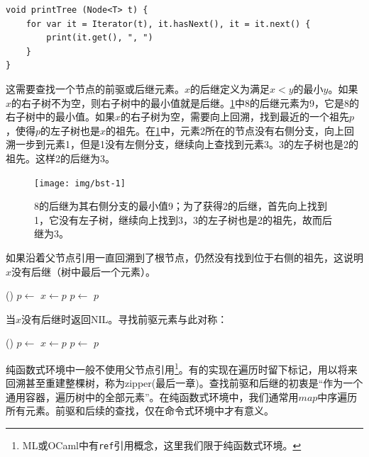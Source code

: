 \documentclass[b5paper]{ctexart}
\begin{document}
\lstset{language=Bourbaki}
\begin{lstlisting}
void printTree (Node<T> t) {
    for var it = Iterator(t), it.hasNext(), it = it.next() {
        print(it.get(), ", ")
    }
}
\end{lstlisting}

这需要查找一个节点的前驱或后继元素。$x$的后继定义为满足$x < y$的最小$y$。如果$x$的右子树不为空，则右子树中的最小值就是后继。\cref{fig:bst-succ}中8的后继元素为9，它是8的右子树中的最小值。如果$x$的右子树为空，需要向上回溯，找到最近的一个祖先$p$，使得$p$的左子树也是$x$的祖先。在\cref{fig:bst-succ}中，元素2所在的节点没有右侧分支，向上回溯一步到元素1，但是1没有左侧分支，继续向上查找到元素3。3的左子树也是2的祖先。这样2的后继为3。

\begin{figure}[htbp]
  \centering
  \texttt{[image: img/bst-1]}
  \caption{8的后继为其右侧分支的最小值9；为了获得2的后继，首先向上找到1，它没有左子树，继续向上找到3，3的左子树也是2的祖先，故而后继为3。} \label{fig:bst-succ}
\end{figure}

如果沿着父节点引用一直回溯到了根节点，仍然没有找到位于右侧的祖先，这说明$x$没有后继（树中最后一个元素）。

\begin{algorithmic}[1]
    \State \Return {}()
  \Else
    \State $p \gets $ 
      \State $x \gets p$
      \State $p \gets $ 
    \EndWhile
    \State \Return $p$
  \EndIf
\EndFunction
\end{algorithmic}

当$x$没有后继时返回NIL。寻找前驱元素与此对称：

\begin{algorithmic}[1]
    \State \Return {}()
  \Else
    \State $p \gets $ 
      \State $x \gets p$
      \State $p \gets $ 
    \EndWhile
    \State \Return $p$
  \EndIf
\EndFunction
\end{algorithmic}

纯函数式环境中一般不使用父节点引用\footnote{ML或OCaml中有\texttt{ref}引用概念，这里我们限于纯函数式环境。}。有的实现在遍历时留下标记，用以将来回溯甚至重建整棵树，称为zipper(\cite{learn-haskell}最后一章)。查找前驱和后继的初衷是“作为一个通用容器，遍历树中的全部元素”。在纯函数式环境中，我们通常用$map$中序遍历所有元素。前驱和后续的查找，仅在命令式环境中才有意义。
\end{document}
